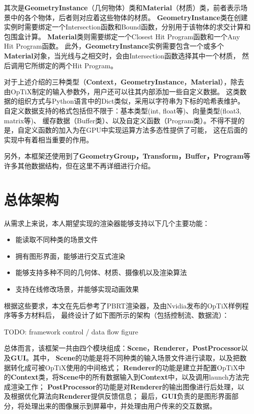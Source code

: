 \label{GeometryInstance}
其次是\textbf{GeometryInstance}（几何物体）类和\textbf{Material}（材质）类，前者表示场景中的各个物体，后者则对应着这些物体的材质。
\textbf{GeometryInstance}类在创建实例时需要绑定一个Intersection函数和Bound函数，分别用于该物体的求交计算和包围盒计算。
\textbf{Material}类则需要绑定一个Closest Hit Program函数和一个Any Hit Program函数。
此外，\textbf{GeometryInstance}实例需要包含一个或多个\textbf{Material}对象，当光线与之相交时，会由Intersection函数选择其中一个材质，
然后调用它所绑定的两个Hit Program。

对于上述介绍的三种类型（\textbf{Context}，\textbf{GeometryInstance}，\textbf{Material}），除去由OpTiX制定的输入参数外，用户还可以往其内部添加一些自定义数据。
这类数据的组织方式与Python语言中的Dict类似，采用以字符串为下标的哈希表维护。
自定义数据支持的格式包括但不限于：基本类型(int, float等)、向量类型(float3, matrix等)、
缓存数据（Buffer类）、以及自定义函数（Program类）。不得不提的是，自定义函数的加入为在GPU中实现运算方法多态性提供了可能，
这在后面的实现中有着相当重要的作用。

另外，本框架还使用到了\textbf{GeometryGroup，Transform，Buffer，Program}等许多其他数据结构，但在这里不再详细进行介绍。

\section{总体架构}
 
从需求上来说，本人期望实现的渲染器能够支持以下几个主要功能：

\begin{itemize}
    \item{能读取不同种类的场景文件}
    \item{拥有图形界面，能够进行交互式渲染}
    \item{能够支持多种不同的几何体、材质、摄像机以及渲染算法}
    \item{支持在线修改场景，并能够实现动画效果}
\end{itemize}

根据这些要求，本文在先后参考了PBRT\cite{pharr2016physically}渲染器，及由Nvidia发布的OpTiX样例程序等多方材料后，
最终设计了如下图所示的架构（包括控制流、数据流）：

TODO: framework control / data flow figure

总体而言，该框架一共由四个模块组成：\textbf{\textbf{Scene}}，\textbf{Renderer}，\textbf{PostProcessor}以及\textbf{GUI}。其中，
\textbf{\textbf{Scene}}的功能是将不同种类的输入场景文件进行读取，以及把数据转化成可被OpTiX使用的中间格式；
\textbf{Renderer}的功能是建立并配置OpTiX中的\textbf{Context}类，将\textbf{\textbf{Scene}}中的所有数据输入到\textbf{Context}中，以及调用launch方法完成渲染工作；
\textbf{PostProcessor}的功能是对\textbf{Renderer}的输出图像进行后处理，以及根据优化算法向\textbf{Renderer}提供反馈信息；
最后，\textbf{GUI}负责的是图形界面部分，将处理出来的图像展示到屏幕中，并处理由用户传来的交互数据。

